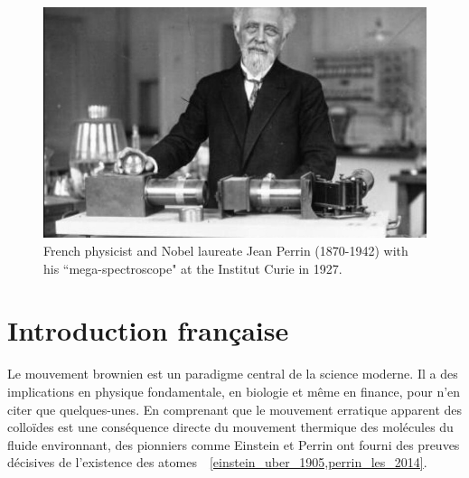 \begin{figure}[h]
	\begin{center}
		\includegraphics[width=16cm]{02_body/introduction/image/perrin.jpg}
		\caption{French physicist and Nobel laureate Jean Perrin (1870-1942) with his ``mega-spectroscope" at the Institut Curie in 1927.}
	\end{center}
\end{figure}


\section{Introduction française}



Le mouvement brownien est un paradigme central de la science moderne. Il a des implications en physique fondamentale, en biologie et même en finance, pour n'en citer que quelques-unes. En comprenant que le mouvement erratique apparent des colloïdes est une conséquence directe du mouvement thermique des molécules du fluide environnant, des pionniers comme Einstein et Perrin ont fourni des preuves décisives de l'existence des atomes~~\ref{einstein_uber_1905,perrin_les_2014}.

